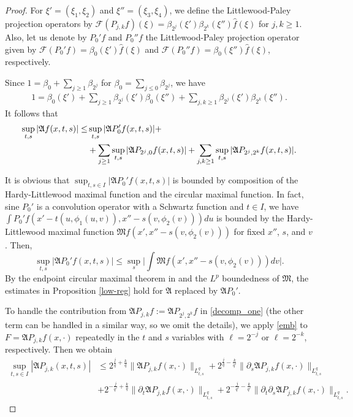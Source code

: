 \documentclass[10pt] %
{amsart}
\theoremstyle{plain}
\numberwithin{equation}{section}
\begin{document}
\begin{proof}
For $\xi' = (\xi_1,\xi_2)$ and $\xi'' =(\xi_3,\xi_4)$, we define the Littlewood-Paley projection operators by $\mathcal F( P_{j,k} f )(\xi) =\beta_{2^j}(  \xi') \beta_{2^k}(  \xi'') \widehat f(\xi)$ for $j,k \ge 1$.
Also, let us denote by $P_0'f$ and $P_0''f$ the Littlewood-Paley projection operator given by $\mathcal F (P_0'f) = \beta_0(\xi') \widehat f(\xi)$ and $\mathcal F (P_0''f) = \beta_0(\xi'') \widehat f(\xi)$, respectively.  

Since $ 1 = \beta_0  + \sum_{j \ge 1} \beta_{2^j}  $ for $\beta_0 = \sum_{j\le0} \beta_{2^j}$, 
we have 
\begin{align*}
1  
= \beta_0(\xi') + \sum_{j\ge 1} \beta_{2^j}(\xi') \beta_0(\xi'') + \sum_{j,k \ge 1} \beta_{2^j}(\xi')\beta_{2^k}(\xi'') .
\end{align*}
It follows that 
\begin{align}
\sup_{t,s} | \mathfrak A f(x,t,s)|    \le & \sup_{t,s} | \mathfrak A P_0' f(x,t,s)|  + \notag \\  &  +  \sum_{j\ge1}\sup_{t,s} | \mathfrak A P_{2^j, 0} f(x,t,s)|  +  \sum_{j,k\ge1} \sup_{t,s} | \mathfrak A P_{2^j, 2^k}f(x,t,s)| . \label{decomp_one}
\end{align}
  
It is obvious that $\sup_{t,s\in I} |\mathfrak A P_0' f(x,t,s)| $ is bounded by composition of the Hardy-Littlewood maximal function and the circular maximal function.
In fact, sine $P_0'$ is a convolution operator with a Schwartz function and $t\in I$, we have $\int P_0' f(x'-t(u,\phi_1(u,v)), x'' - s(v,\phi_2(v)))du$ is bounded by the Hardy-Littlewood maximal function $\mathfrak M f(x', x''-s(v,\phi_2(v)))$ for fixed $x''$, $s$, and $v$. 
Then, 
\[
\sup_{t,s} |\mathfrak A P_0' f(x,t,s)| \le \sup_s  \big| \int  \mathfrak M f(x', x''-s(v,\phi_2(v)))  dv \big|. 
\]
By the endpoint circular maximal theorem in \cite[Theorem 1.1]{Lee} and the $L^p$ boundedness of    $\mathfrak M$, the estimates in Proposition \ref{low-reg} hold for $\mathfrak A$ replaced by $ \mathfrak A P_0'$. 

 
 

To handle the contribution from $\mathfrak AP_{j,k}f := \mathfrak A P_{2^j, 2^k}f$ in \eqref{decomp_one} (the other term can be handled in a similar way, so we omit the details), we apply \eqref{emb} to $F= \mathfrak A P_{j,k} f(x,\cdot)$ repeatedly in the $t$ and $s$ variables with $\ell=2^{-j}$ or $\ell=2^{-k}$, respectively. 
Then we obtain
\begin{align*}
\sup_{t,s\in I}| \mathfrak A P_{j,k} ( x,t,s)| 
&\le 2^{\frac jq+\frac k{q}}
\big\|\mathfrak A P_{j,k} f(x,\cdot)\big\|_{L_{t,s}^q}   
+2^{\frac jq-\frac k{q'}} 
\big\|\partial_s \mathfrak A P_{j,k} f(x,\cdot)\big\|_{L_{t,s}^q}   \\
&+2^{-\frac j{q'}+\frac kq}
\big\| \partial_t \mathfrak A P_{j,k} f(x,\cdot)\big\|_{L_{t,s}^q}  +
2^{-\frac j{q'}-\frac k{q'}} 
\big\| \partial_t \partial_s \mathfrak A P_{j,k} f(x,\cdot)\big\|_{L_{t,s}^q}.
\end{align*}


\end{proof}
\end{document}
